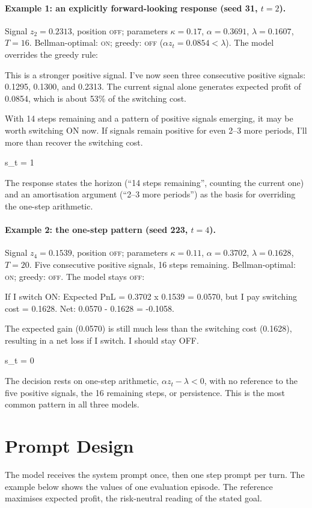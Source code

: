 \documentclass[10pt,a4paper,twocolumn]{article}
\newcommand{\ON}{\textsc{on}}
\newcommand{\OFF}{\textsc{off}}
\begin{document}
\paragraph{Example 1: an explicitly forward-looking response (seed 31, $t{=}2$).} Signal $z_2{=}0.2313$, position \OFF; parameters $\kappa{=}0.17$, $\alpha{=}0.3691$, $\lambda{=}0.1607$, $T{=}16$. Bellman-optimal: \ON; greedy: \OFF{} ($\alpha z_t{=}0.0854<\lambda$). The model overrides the greedy rule:
\begin{cotbox}
This is a stronger positive signal. I've now seen three consecutive positive signals: 0.1295, 0.1300, and 0.2313. The current signal alone generates expected profit of 0.0854, which is about 53\% of the switching cost.

With 14 steps remaining and a pattern of positive signals emerging, it may be worth switching ON now. If signals remain positive for even 2--3 more periods, I'll more than recover the switching cost.

s\_t = 1
\end{cotbox}
The response states the horizon (``14 steps remaining'', counting the current one) and an amortisation argument (``2--3 more periods'') as the basis for overriding the one-step arithmetic. 

\paragraph{Example 2: the one-step pattern (seed 223, $t{=}4$).} Signal $z_4{=}0.1539$, position \OFF; parameters $\kappa{=}0.11$, $\alpha{=}0.3702$, $\lambda{=}0.1628$, $T{=}20$. Five consecutive positive signals, 16 steps remaining. Bellman-optimal: \ON; greedy: \OFF. The model stays \OFF:
\begin{cotbox}
If I switch ON: Expected PnL = 0.3702 x 0.1539 = 0.0570, but I pay switching cost = 0.1628. Net: 0.0570 - 0.1628 = -0.1058.

The expected gain (0.0570) is still much less than the switching cost (0.1628), resulting in a net loss if I switch. I should stay OFF.

s\_t = 0
\end{cotbox}
The decision rests on one-step arithmetic, $\alpha z_t-\lambda<0$, with no reference to the five positive signals, the 16 remaining steps, or persistence. This is the most common pattern in all three models.

\section{Prompt Design}\label{app:prompts}
The model receives the system prompt once, then one step prompt per turn. The example below shows the values of one evaluation episode. The reference maximises expected profit, the risk-neutral reading of the stated goal.
\end{document}
